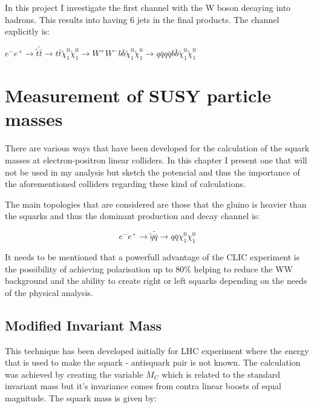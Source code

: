 \documentclass[12pt,a4paper]{report}
\begin{document}
 In this project I investigate the first channel with the W boson decaying into hadrons. This results
 into having 6 jets in the final products. The channel explicitly is:
 
 
 
 
  
 $e^{-}e^{+} \rightarrow \tilde{t}\tilde{\bar{t}} \rightarrow t \bar{t}\tilde{\chi}_{1}^{0}
 \tilde{\chi}^{0}_{1} \rightarrow
 W^{+}W^{-} b \bar{b} \tilde{\chi}_{1}^{0}  \tilde{\chi}_{1}^{0} \rightarrow 
 q \bar{q} q \bar{q} b \bar{b} \tilde{\chi}_{1}^{0}  \tilde{\chi}_{1}^{0}$
 


\newpage

\section{Measurement of SUSY particle masses}

There are various ways that have been developed for the calculation of the squark masses at electron-positron
linear colliders. In this chapter I present one that will not be used in my analysis but sketch the potencial
and thus the importance of the aforementioned colliders regarding these kind of calculations.

The main topologies that are considered are those that the gluino is heavier than the squarks and thus the 
dominant production and decay channel is:

\begin{equation}
 e^{-}e^{+} \rightarrow \tilde{q} \tilde{\bar{q}} \rightarrow q\bar{q}\chi_{1}^{0}\chi_{1}^{0}
\end{equation}

It needs to be mentioned that a powerfull advantage of the CLIC experiment is the possibility of achieving 
polarisation up to 80$\%$ helping to reduce the WW background and the ability to create right or left squarks
depending on the needs of the physical analysis.

\subsection{Modified Invariant Mass}

This technique has been developed initially for LHC experiment where the energy that is used
to make the squark - antisquark pair is not known.
The calculation was achieved by creating the variable $M_{C}$ which is related to the standard 
invariant mass but it's invariance comes from contra linear boosts of equal magnitude. The squark mass is given
by:
\end{document}
